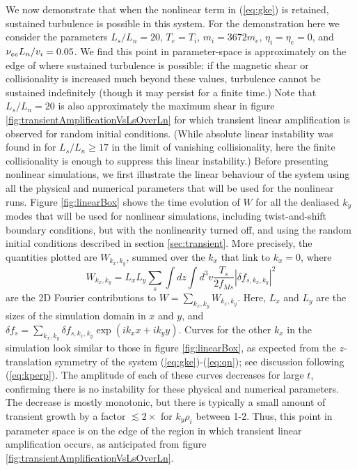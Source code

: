 \documentclass{jpp}
\let\ge=\geqslant  \let\geq=\geqslant
\begin{document}
We now demonstrate that when the nonlinear term in (\ref{eq:gke})
is retained, sustained turbulence is possible
in this system.
For the demonstration here we consider
the parameters $L_s/L_n = 20$, $T_e = T_i$, $m_i = 3672 m_e$, $\eta_i = \eta_e = 0$, and $\nu_{ee} L_n / v_i = 0.05$.
We find this point in parameter-space is approximately on the edge of where sustained turbulence
is possible: if the magnetic shear or collisionality is increased much beyond these values,
turbulence cannot be sustained indefinitely (though it may persist for a finite time.)
Note that $L_s/L_n=20$ is also approximately the maximum shear
in figure \ref{fig:transientAmplificationVsLsOverLn} for which transient linear amplification is observed
for random initial conditions.
(While absolute linear instability was found in \citet{usUniversalInstability} for $L_s/L_n \ge 17$ in the limit of vanishing collisionality, here the finite collisionality is enough to suppress this linear instability.)
Before presenting nonlinear simulations,
we first illustrate the linear behaviour of the system using all the physical and numerical
parameters that will be used for the nonlinear runs.  Figure \ref{fig:linearBox} shows the time evolution of
$W$ for all the dealiased $k_y$ modes that will be
used for nonlinear simulations, including twist-and-shift boundary conditions,
but with the nonlinearity turned off, and
using the random initial conditions described in section \ref{sec:transient}.
More precisely, the quantities plotted are $W_{k_x,k_y}$, summed over the $k_x$ that link to $k_x=0$, where
\begin{equation}
\label{eq:Wk}
W_{k_x,k_y} = L_x L_y \sum_s \int dz \int d^3v \frac{T_s}{2 f_{Ms}}\left|\delta\! f_{s,k_x,k_y}\right|^2
\end{equation}
are the 2D Fourier contributions to $W = \sum_{k_x,k_y} W_{k_x,k_y}$.
Here,
$L_x$ and $L_y$ are the sizes of the simulation domain in $x$ and $y$,
and $\delta\! f_s =\sum_{k_x,k_y} \delta\! f_{s,k_x,k_y} \exp( i k_x x+i k_y y)$.
Curves for the other $k_x$ in the simulation look similar to those in figure \ref{fig:linearBox},
as expected from the $z$-translation symmetry of the system (\ref{eq:gke})-(\ref{eq:qn}); see discussion following (\ref{eq:kperp}).
The amplitude of each
of these curves decreases for large $t$, confirming there is no instability for these physical and
numerical parameters.  The decrease is mostly monotonic, but there is typically a small
amount of transient growth by a factor $ \lesssim 2\times$ for $k_y \rho_i$ between 1-2.
Thus, this point in parameter space is on the edge of the region in which transient linear
amplification occurs, as anticipated from figure \ref{fig:transientAmplificationVsLsOverLn}.
\end{document}
